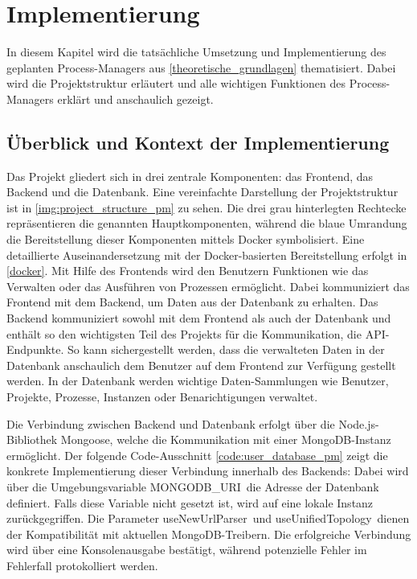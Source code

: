 


\chapter{Implementierung}
In diesem Kapitel wird die tatsächliche Umsetzung und Implementierung des geplanten Process-Managers aus \autoref{theoretische_grundlagen} thematisiert. Dabei wird die Projektstruktur erläutert und alle wichtigen Funktionen des Process-Managers erklärt und anschaulich gezeigt. 


\section{Überblick und Kontext der Implementierung}
Das Projekt gliedert sich in drei zentrale Komponenten: das Frontend, das Backend und die Datenbank. Eine vereinfachte Darstellung der Projektstruktur ist in \autoref{img:project_structure_pm} zu sehen. Die drei grau hinterlegten Rechtecke repräsentieren die genannten Hauptkomponenten, während die blaue Umrandung die Bereitstellung dieser Komponenten mittels Docker symbolisiert. Eine detaillierte Auseinandersetzung mit der Docker-basierten Bereitstellung erfolgt in \autoref{docker}.
Mit Hilfe des Frontends wird den Benutzern Funktionen wie das Verwalten oder das Ausführen von Prozessen ermöglicht. Dabei kommuniziert das Frontend mit dem Backend, um Daten aus der Datenbank zu erhalten. Das Backend kommuniziert sowohl mit dem Frontend als auch der Datenbank und enthält so den wichtigsten Teil des Projekts für die Kommunikation, die API-Endpunkte. So kann sichergestellt werden, dass die verwalteten Daten in der Datenbank anschaulich dem Benutzer auf dem Frontend zur Verfügung gestellt werden. In der Datenbank werden wichtige Daten-Sammlungen wie Benutzer, Projekte, Prozesse, Instanzen oder Benarichtigungen verwaltet. 

Die Verbindung zwischen Backend und Datenbank erfolgt über die Node.js-Bibliothek Mongoose, welche die Kommunikation mit einer MongoDB-Instanz ermöglicht. Der folgende Code-Ausschnitt \ref{code:user_database_pm} zeigt die konkrete Implementierung dieser Verbindung innerhalb des Backends:
Dabei wird über die Umgebungsvariable \glqq MONGODB\_URI\grqq\ die Adresse der Datenbank definiert. Falls diese Variable nicht gesetzt ist, wird auf eine lokale Instanz zurückgegriffen. Die Parameter \glqq useNewUrlParser\grqq\ und \glqq useUnifiedTopology\grqq\ dienen der Kompatibilität mit aktuellen MongoDB-Treibern. Die erfolgreiche Verbindung wird über eine Konsolenausgabe bestätigt, während potenzielle Fehler im Fehlerfall protokolliert werden.

